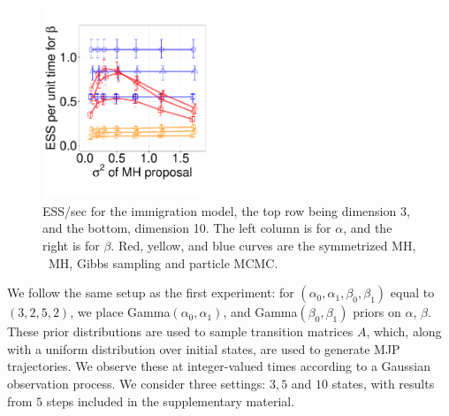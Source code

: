 {\begin{figure}
\begin{minipage}[hp]{0.65\linewidth}
    \includegraphics [width=0.44\textwidth, angle=0]{figs/q_10_beta.pdf}
  \end{minipage}
  \begin{minipage}[!hp]{0.33\linewidth}
    \caption{ESS/sec for the immigration model, the top row being dimension 3, and the bottom,
      dimension 10. The left column is for $\alpha$, and the 
    right is for $\beta$. Red, yellow, and blue curves are the symmetrized MH,
  \naive\ MH, Gibbs sampling and particle MCMC.}
     \label{fig:ESS_Q_D10}
  \end{minipage}
  \vspace{-.4in}
  \end{figure}
We follow the same setup as the first experiment:
for $(\alpha_0,\alpha_1,\beta_0,\beta_1)$ equal to $(3,2,5,2)$,
we place Gamma$(\alpha_0,\alpha_1)$, and Gamma$(\beta_0, \beta_1)$ priors on 
$\alpha$, $\beta$. These prior distributions are used to sample transition 
matrices $A$, which, along with a uniform distribution over initial states,
are used to generate MJP trajectories. We observe these at integer-valued
times according to a Gaussian observation process.
We consider three settings: $3, 5$ and $10$ states, with results from $5$ 
steps included in the supplementary material. 

}
